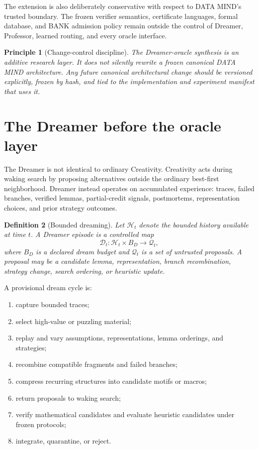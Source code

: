 \documentclass[11pt]{article}
\newtheorem{definition}{Definition}[section]
\newtheorem{principle}[definition]{Principle}
\newcommand{\Dream}{\mathcal D}
\begin{document}
The extension is also deliberately conservative with respect to DATA MIND's trusted boundary. The frozen verifier semantics, certificate languages, formal database, and BANK admission policy remain outside the control of Dreamer, Professor, learned routing, and every oracle interface.

\begin{principle}[Change-control discipline]
The Dreamer-oracle synthesis is an additive research layer. It does not silently rewrite a frozen canonical DATA MIND architecture. Any future canonical architectural change should be versioned explicitly, frozen by hash, and tied to the implementation and experiment manifest that uses it.
\end{principle}

\section{The Dreamer before the oracle layer}

The Dreamer is not identical to ordinary Creativity. Creativity acts during waking search by proposing alternatives outside the ordinary best-first neighborhood. Dreamer instead operates on accumulated experience: traces, failed branches, verified lemmas, partial-credit signals, postmortems, representation choices, and prior strategy outcomes.

\begin{definition}[Bounded dreaming]
Let $\mathcal H_t$ denote the bounded history available at time $t$. A Dreamer episode is a controlled map
\begin{equation}
\Dream_t:\mathcal H_t\times B_D\longrightarrow \mathcal Q_t,
\end{equation}
where $B_D$ is a declared dream budget and $\mathcal Q_t$ is a set of untrusted proposals. A proposal may be a candidate lemma, representation, branch recombination, strategy change, search ordering, or heuristic update.
\end{definition}

A provisional dream cycle is:
\begin{enumerate}[leftmargin=2em]
\item capture bounded traces;
\item select high-value or puzzling material;
\item replay and vary assumptions, representations, lemma orderings, and strategies;
\item recombine compatible fragments and failed branches;
\item compress recurring structures into candidate motifs or macros;
\item return proposals to waking search;
\item verify mathematical candidates and evaluate heuristic candidates under frozen protocols;
\item integrate, quarantine, or reject.
\end{enumerate}
\end{document}
